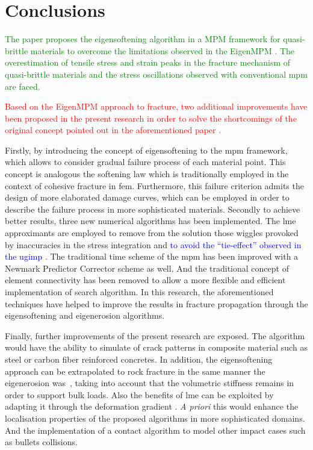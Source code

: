 \documentclass[preprint,12pt,a4paper]{elsarticle}
\newcommand{\PNA}[1]{
  \textcolor{red}{{#1}}
}
\newcommand{\MMP}[1]{
  \textcolor{blue}{{#1}}
}
\newcommand{\DM}[1]{
  \textcolor{green}{{#1}}
}
\begin{document}

\section{Conclusions}
\label{sec:4}

\DM{The paper proposes the eigensoftening algorithm in a \acrshort{MPM} framework for quasi-brittle materials to overcome the limitations observed in the EigenMPM \cite{Zhang_EE_2020}. The overestimation of tensile 
stress and strain peaks in the fracture mechanism of quasi-brittle
materials and the stress oscillations observed with conventional
\acrshort{mpm} are faced.} \PNA{Based on the
EigenMPM approach to fracture, two additional improvements have been proposed in the present research in order to solve the shortcomings of the original concept pointed out in the aforementioned paper \cite{Zhang_EE_2020}.}

Firstly, by introducing the concept of eigensoftening to the \acrshort{mpm} framework,
which allows to consider gradual failure process of each material point. This concept is analogous the softening law which is traditionally employed in the context
of cohesive fracture in \acrshort{fem}. Furthermore, this failure
criterion admits the design of more elaborated damage curves, which
can be employed in order to describe the failure process in more
sophisticated materials. Secondly to achieve better results, three new
numerical algorithms has been implemented. The \acrshort{lme}
approximants are employed to remove from
the solution those wiggles provoked by inaccuracies in the stress
integration and \MMP{to avoid the ``tie-effect'' observed in the
\acrshort{ugimp}}. The traditional time scheme of the \acrshort{mpm}
has been improved with a Newmark Predictor Corrector scheme as
well. And the traditional concept of element connectivity has been
removed to allow a more flexible and efficient implementation of
search algorithm. In this research, the aforementioned techniques have helped
to improve the results in fracture propagation through the
eigensoftening and eigenerosion algorithms.

Finally, further improvements of the present research are exposed. The
algorithm would have the ability to simulate of crack patterns in
composite material such as steel or carbon fiber reinforced
concretes\cite{Navas_2018_ES,Ruiz2019}. In addition, the eigensoftening
approach can be extrapolated to rock fracture in the same manner the
eigenerosion was~\cite{Wang2017}, taking into account that the
volumetric stiffness remains in order to support bulk loads. Also the
benefits of \acrshort{lme} can be exploited by adapting it through the
deformation gradient \cite{Kochmann2019}. \textit{A priori} this would
enhance the localisation properties of the proposed algorithms in more
sophisticated domains. And the implementation of a contact algorithm to model other impact cases such as bullets collisions. 
\end{document}
